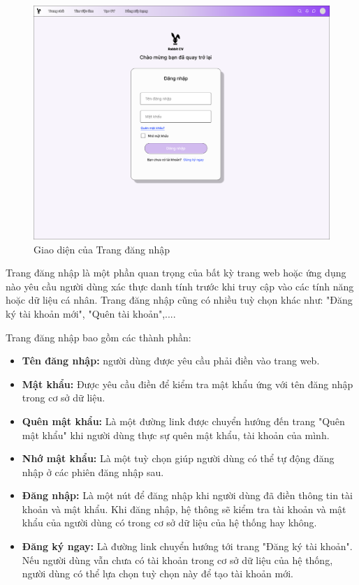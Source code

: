 \begin{figure}[H]
\begin{center}
    \includegraphics[scale=0.2]{img/Login.png}
    \caption{Giao diện của Trang đăng nhập}
\end{center}
\end{figure}

Trang đăng nhập là một phần quan trọng của bất kỳ trang web hoặc ứng dụng nào yêu cầu người dùng xác thực danh tính trước khi truy cập vào các tính năng hoặc dữ liệu cá nhân. Trang đăng nhập cũng có nhiều tuỳ chọn khác như: "Đăng ký tài khoản mới", "Quên tài khoản",.... 

Trang đăng nhập bao gồm các thành phần:

\begin{itemize}
    \item \textbf{Tên đăng nhập:} người dùng được yêu cầu phải điền vào trang web.
    \item \textbf{Mật khẩu:} Được yêu cầu điền để kiểm tra mật khẩu ứng với tên đăng nhập trong cơ sở dữ liệu.
    \item \textbf{Quên mật khẩu:} Là một đường link được chuyển hướng đến trang "Quên mật khẩu" khi người dùng thực sự quên mật khẩu, tài khoản của mình.
    \item \textbf{Nhớ mật khẩu:} Là một tuỳ chọn giúp người dùng có thể tự động đăng nhập ở các phiên đăng nhập sau.
    \item \textbf{Đăng nhập:} Là một nút để đăng nhập khi người dùng đã điền thông tin tài khoản và mật khẩu. Khi đăng nhập, hệ thông sẽ kiểm tra tài khoản và mật khẩu của người dùng có trong cơ sở dữ liệu của hệ thống hay không.
    \item \textbf{Đăng ký ngay:} Là đường link chuyển hướng tới trang "Đăng ký tài khoản". Nếu người dùng vẫn chưa có tài khoản trong cơ sở dữ liệu của hệ thống, người dùng có thể lựa chọn tuỳ chọn này để tạo tài khoản mới.
\end{itemize}

